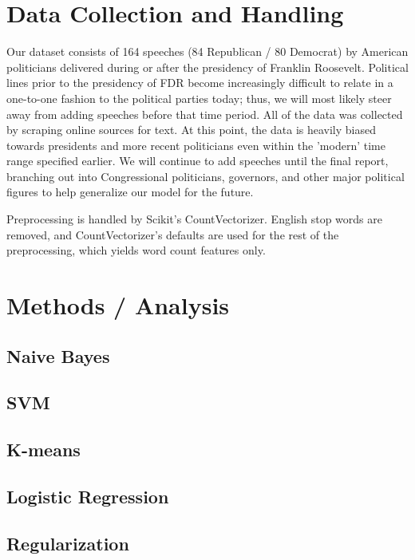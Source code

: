\documentclass[twocolumn]{article}
\begin{document}
\section{Data Collection and Handling}

Our dataset consists of 164 speeches (84 Republican / 80 Democrat) by American politicians delivered during or after the presidency of Franklin Roosevelt. Political lines prior to the presidency of FDR become increasingly difficult to relate in a one-to-one fashion to the political parties today; thus, we will most likely steer away from adding speeches before that time period. All of the data was collected by scraping online sources for text. At this point, the data is heavily biased towards presidents and more recent politicians even within the 'modern' time range specified earlier. We will continue to add speeches until the final report, branching out into Congressional politicians, governors, and other major political figures to help generalize our model for the future. 

Preprocessing is handled by Scikit's CountVectorizer. English stop words are removed, and CountVectorizer's defaults are used for the rest of the preprocessing, which yields word count features only.

\section{Methods / Analysis}

\subsection{Naive Bayes}

\subsection{SVM}

\subsection{K-means}

\subsection{Logistic Regression}

\subsection{Regularization}
\end{document}
